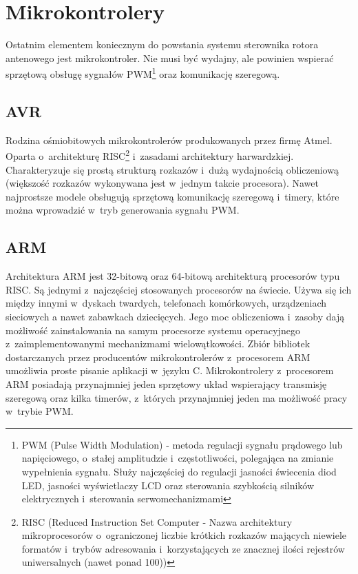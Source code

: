 \documentclass[eng,oneside]{mgr}
\begin{document}
		\section{Mikrokontrolery}
		Ostatnim elementem koniecznym do powstania systemu sterownika rotora antenowego jest mikrokontroler. Nie musi być wydajny, ale powinien wspierać sprzętową obsługę sygnałów PWM\footnote{PWM (Pulse Width Modulation) - metoda regulacji sygnału prądowego lub napięciowego, o~stałej amplitudzie i~częstotliwości, polegająca na zmianie wypełnienia sygnału. Służy najczęściej do regulacji jasności świecenia diod LED, jasności wyświetlaczy LCD oraz sterowania szybkością silników elektrycznych i~sterowania serwomechanizmami} oraz komunikację szeregową. 

			\subsection{AVR}
			Rodzina ośmiobitowych mikrokontrolerów produkowanych przez firmę Atmel. Oparta o~architekturę RISC\footnote{RISC (Reduced Instruction Set Computer - Nazwa architektury mikroprocesorów o~ograniczonej liczbie krótkich rozkazów mających niewiele formatów i~trybów adresowania i~korzystających ze znacznej ilości rejestrów uniwersalnych (nawet ponad 100))} i~zasadami architektury harwardzkiej. Charakteryzuje się prostą strukturą rozkazów i~dużą wydajnością obliczeniową (większość rozkazów wykonywana jest w~jednym takcie procesora). Nawet najprostsze modele obsługują sprzętową komunikację szeregową i~timery, które można wprowadzić w~tryb generowania sygnału PWM.

			\subsection{ARM}
			Architektura ARM jest 32-bitową oraz 64-bitową architekturą procesorów typu RISC. Są jednymi z~najczęściej stosowanych procesorów na świecie. Używa się ich między innymi w~dyskach twardych, telefonach komórkowych, urządzeniach sieciowych a nawet zabawkach dziecięcych. Jego moc obliczeniowa i~zasoby dają możliwość zainstalowania na samym procesorze systemu operacyjnego z~zaimplementowanymi mechanizmami wielowątkowości. Zbiór bibliotek dostarczanych przez producentów mikrokontrolerów z~procesorem ARM umożliwia proste pisanie aplikacji w~języku C. Mikrokontrolery z~procesorem ARM posiadają przynajmniej jeden sprzętowy układ wspierający transmisję szeregową oraz kilka timerów, z~których przynajmniej jeden ma możliwość pracy w~trybie PWM.
\end{document}
